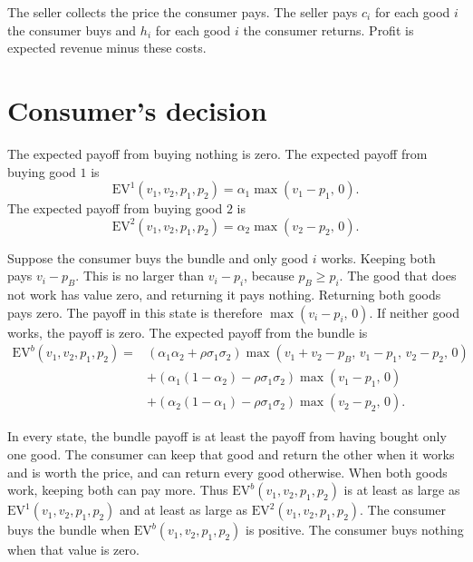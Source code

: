 \documentclass[11pt]{article}
\begin{document}
The seller collects the price the consumer pays. The seller pays $c_i$ for
each good $i$ the consumer buys and $h_i$ for each good $i$ the consumer
returns. Profit is expected revenue minus these costs.

\section{Consumer's decision}

The expected payoff from buying nothing is zero. The expected payoff from
buying good $1$ is
\[
  \mathrm{EV}^{1}(v_1,v_2,p_1,p_2)=\alpha_1\max(v_1-p_1,\,0).
\]
The expected payoff from buying good $2$ is
\[
  \mathrm{EV}^{2}(v_1,v_2,p_1,p_2)=\alpha_2\max(v_2-p_2,\,0).
\]

Suppose the consumer buys the bundle and only good $i$ works. Keeping both
pays $v_i-p_B$. This is no larger than $v_i-p_i$, because $p_B\ge p_i$.
The good that does not work has value zero, and returning it pays nothing.
Returning both goods pays zero. The payoff in this state is therefore $\max(v_i-p_i,\,0)$. If
neither good works, the payoff is zero. The expected payoff from the bundle
is
\begin{align*}
  \mathrm{EV}^{b}(v_1,v_2,p_1,p_2)
  ={}&(\alpha_1\alpha_2+\rho\sigma_1\sigma_2)
  \max(v_1+v_2-p_B,\,v_1-p_1,\,v_2-p_2,\,0)\\
  &+(\alpha_1(1-\alpha_2)-\rho\sigma_1\sigma_2)\max(v_1-p_1,\,0)\\
  &+(\alpha_2(1-\alpha_1)-\rho\sigma_1\sigma_2)\max(v_2-p_2,\,0).
\end{align*}

In every state, the bundle payoff is at least the payoff from having bought
only one good. The consumer can keep that good and return the other when it
works and is worth the price, and can return every good otherwise. When both
goods work, keeping both can pay more. Thus
$\mathrm{EV}^{b}(v_1,v_2,p_1,p_2)$ is at least as large as
$\mathrm{EV}^{1}(v_1,v_2,p_1,p_2)$ and at least as large as
$\mathrm{EV}^{2}(v_1,v_2,p_1,p_2)$. The consumer buys the bundle when
$\mathrm{EV}^{b}(v_1,v_2,p_1,p_2)$ is positive. The consumer buys nothing
when that value is zero.
\end{document}
